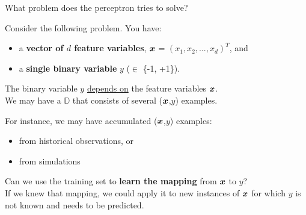 \begin{frame}[t]{What problem does the perceptron tries to solve?}

    Consider the following problem. You have:
    \begin{itemize}
        \item a {\bf vector of $d$ feature variables}, $\boldsymbol{x}$ = $(x_1, x_2, ..., x_d)^T$, and
        \item a {\bf single binary variable} $y$ ($\in$ \{-1, +1\}).   
    \end{itemize}
    The binary variable $y$ \underline{depends on} the feature variables $\boldsymbol{x}$.\\
    \vspace{0.4cm}
    We may have a  $\mathbb{D}$ that 
    consists of several ($\boldsymbol{x}$,$y$) examples.\\
    \begin{blockexample}{}
        \small
        For instance, we may have accumulated ($\boldsymbol{x}$,$y$) examples:
        \begin{itemize}
            \small
            \item from historical observations, or
            \item from simulations
        \end{itemize}
    \end{blockexample}  
    \vspace{0.2cm}
    Can we use the training set to {\bf learn the mapping} from $\boldsymbol{x}$ to $y$?\\
    \vspace{0.2cm}
    If we knew that mapping, we could apply it to new instances of $\boldsymbol{x}$
    for which $y$ is not known and needs to be predicted.
\end{frame}

%
%
%

